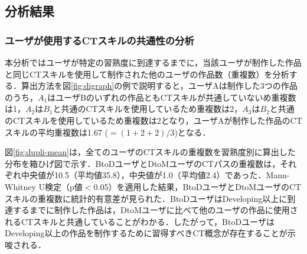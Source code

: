 \documentclass[submit,ses,noauthor]{ipsj}
\begin{document}
\vspace{-2mm}
\subsection{分析結果}\label{sec:3-analysis}

\subsubsection{ユーザが使用するCTスキルの共通性の分析}\label{subsec:path-analysis}

本分析ではユーザが特定の習熟度に到達するまでに，当該ユーザが制作した作品と同じCTスキルを使用して制作された他のユーザの作品数（重複数）を分析する．算出方法を図\ref{fig:digraph}の例で説明すると，ユーザAは制作した3つの作品のうち，$A_1$はユーザBのいずれの作品ともCTスキルが共通していないめ重複数は1，$A_2$は$B_1$と共通のCTスキルを使用しているため重複数は2，$A_3$は$B_2$と共通のCTスキルを使用しているため重複数は2となり，ユーザAが制作した作品のCTスキルの平均重複数は1.67 ($=(1 + 2 + 2) / 3$)となる．

図\ref{fig:dupli-mean}は，全てのユーザのCTスキルの重複数を習熟度別に算出した分布を箱ひげ図で示す．BtoDユーザとDtoMユーザのCTパスの重複数は，それぞれ中央値が10.5（平均値35.8），中央値が1.0（平均値2.4）であった．Mann-Whitney U検定（p値$<$0.05）を適用した結果，BtoDユーザとDtoMユーザのCTスキルの重複数に統計的有意差が見られた．BtoDユーザはDeveloping以上に到達するまでに制作した作品は，DtoMユーザに比べて他のユーザの作品に使用されるCTスキルと共通していることがわかる．したがって，BtoDユーザはDeveloping以上の作品を制作するために習得すべきCT概念が存在することが示唆される．

\end{document}
